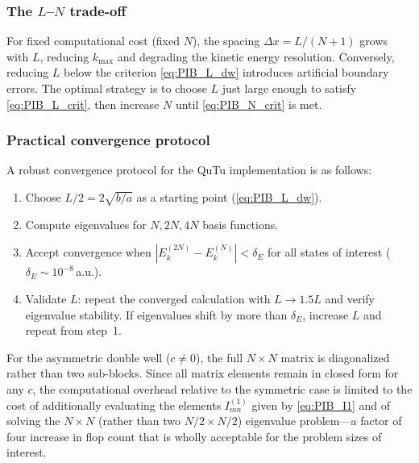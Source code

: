 \subsubsection{The $L$--$N$ trade-off}

For fixed computational cost (fixed $N$), the spacing $\Delta x = L/(N+1)$ grows
with $L$, reducing $k_{\max}$ and degrading the kinetic energy resolution.
Conversely, reducing $L$ below the criterion \cref{eq:PIB_L_dw} introduces
artificial boundary errors.  The optimal strategy is to choose $L$ just large
enough to satisfy \cref{eq:PIB_L_crit}, then increase $N$ until
\cref{eq:PIB_N_crit} is met.

\subsubsection{Practical convergence protocol}\label{sec:PIB_protocol}

A robust convergence protocol for the QuTu implementation is as follows:
\begin{enumerate}
  \item Choose $L/2 = 2\sqrt{b/a}$ as a starting point (\cref{eq:PIB_L_dw}).
  \item Compute eigenvalues for $N, 2N, 4N$ basis functions.
  \item Accept convergence when $|E_k^{(2N)} - E_k^{(N)}| < \delta_E$ for
        all states of interest ($\delta_E \sim 10^{-8}$\,a.u.).
  \item Validate $L$: repeat the converged calculation with $L \to 1.5L$ and
        verify eigenvalue stability.  If eigenvalues shift by more than $\delta_E$,
        increase $L$ and repeat from step~1.
\end{enumerate}
For the asymmetric double well ($c \neq 0$), the full $N \times N$ matrix is
diagonalized rather than two sub-blocks.  Since all matrix elements remain in
closed form for any $c$, the computational overhead relative to the symmetric
case is limited to the cost of additionally evaluating the elements
$I_{mn}^{(1)}$ given by \cref{eq:PIB_I1} and of solving the $N \times N$
(rather than two $N/2 \times N/2$) eigenvalue problem---a factor of four
increase in flop count that is wholly acceptable for the problem sizes of
interest.

